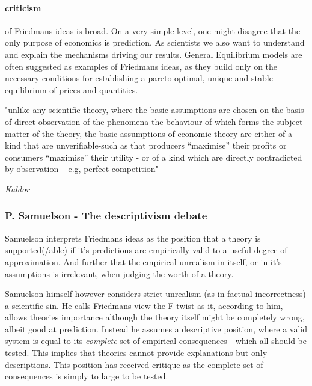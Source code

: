 \documentclass[12pt, a4paper]{article}
\begin{document}
\begin{multicols}{2}
\paragraph{criticism} of Friedmans ideas is broad. On a very simple level, one might disagree that the only purpose of economics is prediction. As scientists we also want to understand and explain the mechanisms driving our results. General Equilibrium models are often suggested as examples of Friedmans ideas, as they build only on the necessary conditions for establishing a pareto-optimal, unique and stable equilibrium of prices and quantities. 
\epigraph{"unlike any scientific theory, where the basic assumptions are chosen on the basis of direct observation of the phenomena the behaviour of which forms the subject-matter of the theory, the basic assumptions of economic theory are either of a kind that are unverifiable-such as that producers “maximise” their profits or consumers “maximise” their utility - or of a kind which are directly contradicted by observation – e.g, perfect competition"}{\textit{Kaldor}}
\subsubsection{P. Samuelson - The descriptivism debate}
Samuelson interprets Friedmans ideas as the position that a theory is supported(/able) if it's predictions are empirically valid to a useful degree of approximation. And further that the empirical unrealism in itself, or in it's assumptions is irrelevant, when judging the worth of a theory.

Samuelson himself however considers strict unrealism (as in factual incorrectness) a scientific sin. He calls Friedmans view the F-twist as it, according to him, allows theories importance although the theory itself might be completely wrong, albeit good at prediction. Instead he assumes a descriptive position, where a valid system is equal to its \textit{complete} set of empirical consequences - which all should be tested. This implies that theories cannot provide explanations but only descriptions.
This position has received critique as the complete set of consequences is simply to large to be tested. 


\end{multicols}
\end{document}

